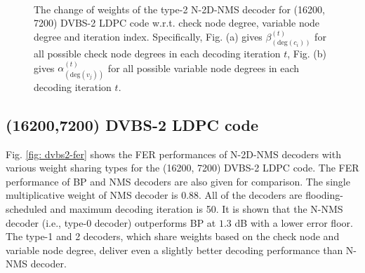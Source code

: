 \documentclass [PhD] {uclathes}
\begin{document}
\begin{figure}[hp] 
    \centering
  \\
  \caption{ The change of weights of the type-2 N-2D-NMS decoder for (16200, 7200) DVBS-2 LDPC code w.r.t. check node degree, variable node degree and iteration index.
  Specifically, Fig. (a) gives $\beta^{(t)}_{(\text{deg}({c_i}))}$ for all possible check node degrees in each decoding iteration $t$, Fig. (b) gives $\alpha^{(t)}_{(\text{deg}({v_j}))}$ for all possible variable node degrees in each decoding iteration $t$.}
\end{figure}

\subsection{(16200,7200) DVBS-2 LDPC code}
Fig. \ref{fig: dvbs2-fer} shows the FER performances of N-2D-NMS decoders with various weight sharing types for the (16200, 7200) DVBS-2 LDPC code. 
The FER performance of BP and NMS decoders are also given for comparison.  The single multiplicative weight of  NMS decoder is 0.88.
All of the decoders are flooding-scheduled and maximum decoding iteration is 50. 
It is shown that the N-NMS decoder (i.e., type-0 decoder) outperforms BP at $1.3$ dB with a lower error floor. The type-1 and 2 decoders, which share weights based on the check node and variable node degree, deliver even a slightly better decoding performance than N-NMS decoder.
\end{document}
